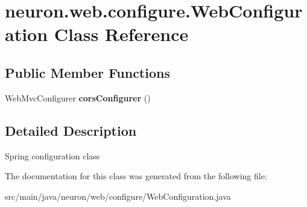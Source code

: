 \hypertarget{classneuron_1_1web_1_1configure_1_1WebConfiguration}{}\section{neuron.\+web.\+configure.\+Web\+Configuration Class Reference}
\label{classneuron_1_1web_1_1configure_1_1WebConfiguration}
\subsection*{Public Member Functions}
\begin{DoxyCompactItemize}
\item 
\mbox{\label{classneuron_1_1web_1_1configure_1_1WebConfiguration_aced1eb34f57d17cf2ebb95b2b0036f94}} 
Web\+Mvc\+Configurer {\bfseries cors\+Configurer} ()
\end{DoxyCompactItemize}


\subsection{Detailed Description}
Spring configuration class 

The documentation for this class was generated from the following file\+:\begin{DoxyCompactItemize}
\item 
src/main/java/neuron/web/configure/Web\+Configuration.\+java\end{DoxyCompactItemize}
